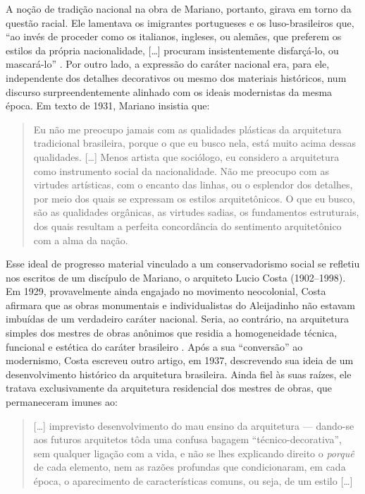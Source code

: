 A noção de tradição nacional na obra de Mariano, portanto, girava em
torno da questão racial. Ele lamentava os imigrantes portugueses e os
luso-brasileiros que, ``ao invés de proceder como os italianos,
ingleses, ou alemães, que preferem os estilos da própria nacionalidade,
{[}\ldots{]} procuram insistentemente disfarçá-lo, ou mascará-lo''
\autocite[p.~32]{mariannofilho:1943margem}. Por outro lado, a expressão
do caráter nacional era, para ele, independente dos detalhes decorativos
ou mesmo dos materiais históricos, num discurso surpreendentemente
alinhado com os ideais modernistas da mesma época. Em texto de 1931,
Mariano insistia que:

\begin{quote}
Eu não me preocupo jamais com as qualidades plásticas da arquitetura
tradicional brasileira, porque o que eu busco nela, está muito acima
dessas qualidades. {[}\ldots{]} Menos artista que sociólogo, eu
considero a arquitetura como instrumento social da nacionalidade. Não me
preocupo com as virtudes artísticas, com o encanto das linhas, ou o
esplendor dos detalhes, por meio dos quais se expressam os estilos
arquitetônicos. O que eu busco, são as qualidades orgânicas, as virtudes
sadias, os fundamentos estruturais, dos quais resultam a perfeita
concordância do sentimento arquitetônico com a alma da nação.
\autocite[p.~64]{mariannofilho:1943margem}
\end{quote}

Esse ideal de progresso material vinculado a um conservadorismo social
se refletiu nos escritos de um discípulo de Mariano, o arquiteto Lucio
Costa (1902--1998). Em 1929, provavelmente ainda engajado no movimento
neocolonial, Costa afirmara que as obras monumentais e individualistas
do Aleijadinho não estavam imbuídas de um verdadeiro caráter nacional.
Seria, ao contrário, na arquitetura simples dos mestres de obras
anônimos que residia a homogeneidade técnica, funcional e estética do
caráter brasileiro \autocite[p.~22]{puppi:1998historia}. Após a sua
``conversão'' ao modernismo, Costa escreveu outro artigo, em 1937,
descrevendo sua ideia de um desenvolvimento histórico da arquitetura
brasileira. Ainda fiel às suas raízes, ele tratava exclusivamente da
arquitetura residencial dos mestres de obras, que permaneceram imunes
ao:

\begin{quote}
{[}\ldots{]} imprevisto desenvolvimento do mau ensino da arquitetura ---
dando-se aos futuros arquitetos tôda uma confusa bagagem
``técnico-decorativa'', sem qualquer ligação com a vida, e não se lhes
explicando direito o \emph{porquê} de cada elemento, nem as razões
profundas que condicionaram, em cada época, o aparecimento de
características comuns, ou seja, de um estilo {[}\ldots{]}
\autocite[p.~39]{costa:1937documentacao1}
\end{quote}

